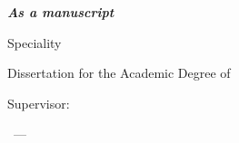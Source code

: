 \thispagestyle{empty}
\begin{center}
\thesisOrganization
\end{center}
%
\vspace{0pt plus4fill} 
\begin{flushright}
\textbf{\textit{As a manuscript}}
\end{flushright}
%
\vspace{0pt plus6fill} 
\begin{center}
{\large \thesisAuthor}
\end{center}
%
\vspace{0pt plus1fill} 
\begin{center}
\textbf {\large
\thesisTitle}

\vspace{0pt plus2fill} 
{
 Speciality \thesisSpecialtyNumber\ \thesisSpecialtyTitle
}

\vspace{0pt plus2fill} 
Dissertation for the Academic Degree of

\thesisDegree
\end{center}
%
\vspace{0pt plus4fill} 
\begin{flushright}
%
%
%
%
Supervisor:

\supervisorRegalia

\supervisorFio

\end{flushright}
%
\vspace{0pt plus4fill} 
{\centering\thesisCity\ --- \thesisYear\par}
